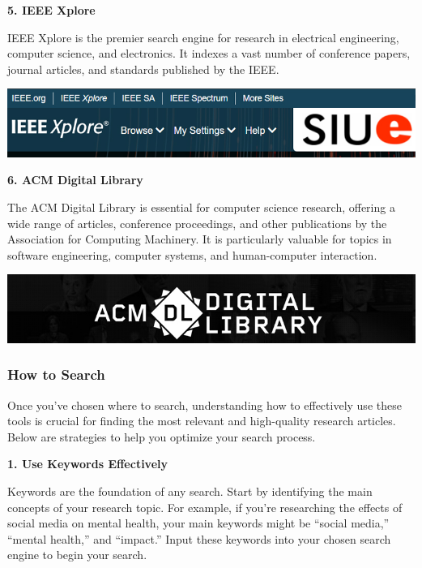 \documentclass[
]{book}
\begin{document}
\textbf{5. IEEE Xplore}

IEEE Xplore is the premier search engine for research in electrical engineering, computer science, and electronics. It indexes a vast number of conference papers, journal articles, and standards published by the IEEE.

\href{https://ieeexplore.ieee.org/Xplore/home.jsp}{\includegraphics[width=1\textwidth,height=\textheight]{images/ieee-xplore.jpg}}

\textbf{6. ACM Digital Library}

The ACM Digital Library is essential for computer science research, offering a wide range of articles, conference proceedings, and other publications by the Association for Computing Machinery. It is particularly valuable for topics in software engineering, computer systems, and human-computer interaction.

\href{https://dl.acm.org/}{\includegraphics[width=1\textwidth,height=\textheight]{images/acm-digital-library.jpg}}

\subsubsection*{How to Search}\label{how-to-search}

Once you've chosen where to search, understanding how to effectively use these tools is crucial for finding the most relevant and high-quality research articles. Below are strategies to help you optimize your search process.

\textbf{1. Use Keywords Effectively}

Keywords are the foundation of any search. Start by identifying the main concepts of your research topic. For example, if you're researching the effects of social media on mental health, your main keywords might be ``social media,'' ``mental health,'' and ``impact.'' Input these keywords into your chosen search engine to begin your search.
\end{document}
